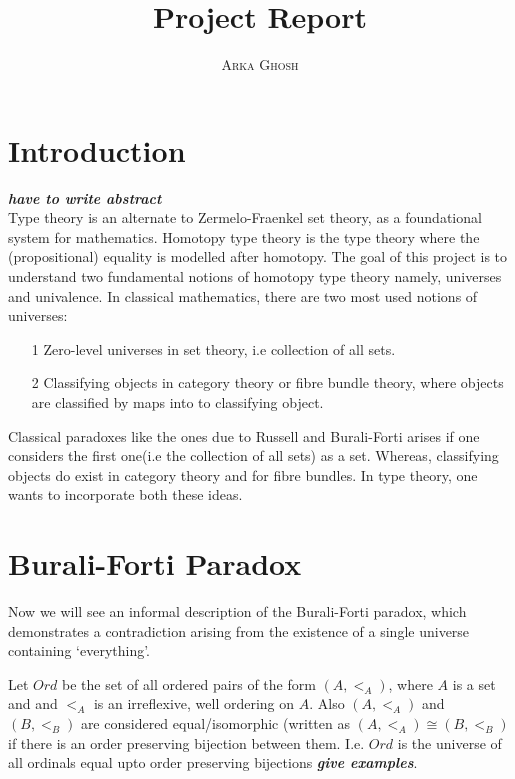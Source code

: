 \documentclass[11pt]{article}
\title{\bf{Project Report}}
\author{\textsc{Arka Ghosh}}
\theoremstyle{definition}
\theoremstyle{plain}
\theoremstyle{remark}
\begin{document}
\begin{titlepage}

\maketitle

\tableofcontents
\end{titlepage}

\section{Introduction}\label{Intro}
\textbf{\textit{have to write abstract}}\\
Type theory is an alternate to Zermelo-Fraenkel set theory, as a foundational system for mathematics. Homotopy type theory is the type theory where the (propositional) equality is modelled after homotopy. The goal of this project is to understand two fundamental notions of homotopy type theory namely, universes and univalence. In classical mathematics, there are two most used notions of universes:

\begin{enumerate}

\item[1] Zero-level universes in set theory, i.e collection of all sets.

\item[2] Classifying objects in category theory or fibre bundle theory, where objects are 
         classified by maps into to classifying object.  

\end{enumerate}

\noindent Classical paradoxes like the ones due to Russell and Burali-Forti arises if one 
considers the first one(i.e the collection of all sets) as a set. Whereas, classifying objects 
do exist in category theory and for fibre bundles. In type theory, one wants to incorporate 
both these ideas. 

\section{Burali-Forti Paradox}\label{S:BFP}

Now we will see an informal description of the Burali-Forti paradox, which demonstrates a
contradiction arising from the existence of a single universe containing `everything'.\smallskip

Let $Ord$ be the set of all ordered pairs of the form $(A, <_A)$, where $A$ is a set and
and $<_A$ is an irreflexive, well ordering on $A$. Also $(A, <_A)$ and $(B, <_B)$ are 
considered equal/isomorphic (written as $(A,<_A) \cong (B,<_B)$ if there is an order 
preserving bijection between them. I.e. $Ord$ is the universe of all ordinals equal upto 
order preserving bijections \textbf{\textit{give examples}}.\smallskip
\end{document}
